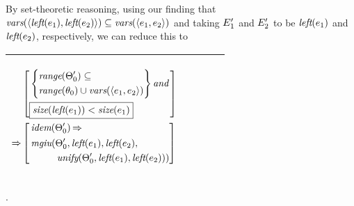 \documentclass[runningheads]{llncs}
\DeclareMathOperator{\uand}{\emph{and}\,}
\DeclareMathOperator{\uimplies}{\Rightarrow}
\DeclareMathOperator{\unify}{\emph{unify}}
\DeclareMathOperator{\lef}{\emph{left}}
\DeclareMathOperator{\idem}{\emph{idem}}
\DeclareMathOperator{\mgiu}{\emph{mgiu}}
\begin{document}
\noindent By set-theoretic reasoning, using our finding that $ \vars(\langle \lef(\e{1}), \lef(\e{2}) \rangle) \subseteq \\
      \vars(\langle \e{1}, \e{2} \rangle)$
      and taking $E_{1}'$ and $E_{2}'$ to be $\lef(\e{1})$ and $\lef(\e{2})$, respectively, we can reduce this to
  \begin{center}
  \begin{tabular}{|m{}|m{}||m{}|}
\hline
\begin{center}
{$\begin{aligned}
 &\begin{aligned}
&\begin{aligned}
&\left[\begin{aligned}
 &\left\{\begin{aligned}
 &\range(\Thet{0}') \subseteq \\
  &\range(\thet{0})\cup\vars(\langle \e{1}, \e{2} \rangle) 
  \end{aligned}\right\} \uand  \\
  &\boxed{\size(\lef(\e{1})) < \size(\e{1})}
  \end{aligned} \right] 
  \end{aligned} 
\end{aligned} \\
 \uimplies &\left[\begin{aligned}&\idem(\Thet{0}') \uimplies \\
 &\begin{aligned}
    {\,\mgiu}(&\Thet{0}', \lef(\e{1}), \lef(\e{2}), \\
    &\unify(\Thet{0}', \lef(\e{1}), \lef(\e{2}))) 
\end{aligned}
\end{aligned}\right] \end{aligned}  $}  \hspace{1cm} 
\end{center}& &  \\  \hline
\end{tabular}.
\end{center}
\end{document}
